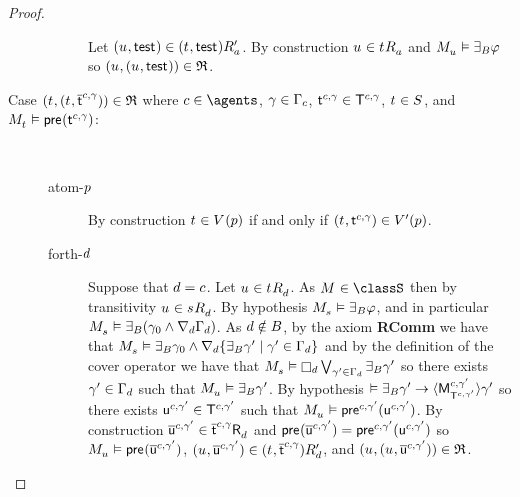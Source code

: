 \begin{proof}
\begin{description}
\begin{description}
                Let $(\kStateU, \aStateTest) \in \kSuccessorsPA{(\kStateT, \aStateTest)}$.
                By construction $\kStateU \in \kSuccessorsA{\kStateT}$ and $\kPModel{\kStateU} \entails \somerefsBs \phi$ so $(\kStateU, (\kStateU, \aStateTest)) \in \refinement$.
        \end{description}
    \item[{Case $(\kStateT, (\kStateT, \aPStateT[\agentC, \gamma])) \in \refinement$ where $\agentC \in \agents$, $\gamma \in \Gamma_\agentC$, $\aStateT[\agentC, \gamma] \in \aStatesT[\agentC, \gamma]$, $\kStateT \in \kStates$, and $\kPModel{\kStateT} \entails \aPrecondition(\aStateT[\agentC, \gamma])$:}] \hfill\\
        \begin{description}
            \item[atom-$\atomP$]
                By construction $\kStateT \in \kValuation(\atomP)$ if and only if $(\kStateT, \aStateT[\agentC, \gamma]) \in \kValuationP(\atomP)$.
            \item[forth-$\agentD$]
                Suppose that $\agentD = \agentC$.
                Let $\kStateU \in \kSuccessorsD{\kStateT}$.
                As $\kModel \in \classS$ then by transitivity $\kStateU \in \kSuccessorsD{\kStateS}$.
                By hypothesis $\kPModel{\kStateS} \entails \someactsBs \phi$, and in particular $\kPModel{\kStateS} \entails \someactsBs (\gamma_0 \land \coversD \Gamma_\agentD)$.
                As $\agentD \notin \agentsB$, by the \axiomAamlS{} axiom {\bf RComm} we have that $\kPModel{\kStateS} \entails \someactsBs \gamma_0 \land \coversD \{\someactsBs \gamma' \mid \gamma' \in \Gamma_\agentD\}$ and by the definition of the cover operator we have that $\kPModel{\kStateS} \entails \necessaryD \bigvee_{\gamma' \in \Gamma_\agentD} \someactsBs \gamma'$ so there exists $\gamma' \in \Gamma_\agentD$ such that $\kPModel{\kStateU} \entails \someactsBs \gamma'$.
                By hypothesis $\entails \someactsBs \gamma' \implies \actionE{\aPModel[\agentC, \gamma']{\aStatesT[\agentC, \gamma']}} \gamma'$ so there exists $\aStateU[\agentC, \gamma'] \in \aStatesT[\agentC, \gamma']$ such that $\kPModel{\kStateU} \entails \aPrecondition[\agentC, \gamma'](\aStateU[\agentC, \gamma'])$.
                By construction $\aPStateU[\agentC, \gamma'] \in \aSuccessorsD{\aPStateT[\agentC, \gamma]}$ and $\aPrecondition(\aPStateU[\agentC, \gamma']) = \aPrecondition[\agentC, \gamma'](\aStateU[\agentC, \gamma'])$ so $\kPModel{\kStateU} \entails \aPrecondition(\aPStateU[\agentC, \gamma'])$, $(\kStateU, \aPStateU[\agentC, \gamma']) \in \kSuccessorsPD{(\kStateT, \aPStateT[\agentC, \gamma])}$, and $(\kStateU, (\kStateU, \aPStateU[\agentC, \gamma'])) \in \refinement$.


\end{description}
\end{description}
\end{proof}

